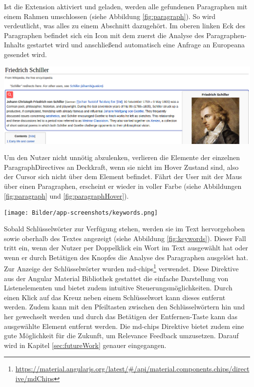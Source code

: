 Ist die Extension aktiviert und geladen, werden alle gefundenen Paragraphen mit einem Rahmen umschlossen (siehe Abbildung \ref{fig:paragraph}). So wird verdeutlicht, was alles zu einem Abschnitt dazugehört. Im oberen linken Eck des Paragraphen befindet sich ein Icon mit dem zuerst die Analyse des Paragraphen-Inhalts gestartet wird und anschließend automatisch eine Anfrage an Europeana gesendet wird.

 \begin{minipage}{\linewidth}
	\centering
	\vspace*{0.5cm}
	\includegraphics[width=\linewidth]{Bilder/app-screenshots/paragraph-hovered.png}
	\label{fig:paragraphHover}
	\vspace*{0.5cm}
 \end{minipage}

 Um den Nutzer nicht unnötig abzulenken, verlieren die Elemente der einzelnen ParagraphDirectives an Deckkraft, wenn sie nicht im Hover Zustand sind, also der Cursor sich nicht über dem Element befindet. Fährt der User mit der Maus über einen Paragraphen, erscheint er wieder in voller Farbe (siehe Abbildungen \ref{fig:paragraph} und \ref{fig:paragraphHover}).

 \begin{minipage}{\linewidth}
	\centering
	\vspace*{0.5cm}
	\texttt{[image: Bilder/app-screenshots/keywords.png]}
	\label{fig:keywords}
	\vspace*{0.5cm}
 \end{minipage}

 Sobald Schlüsselwörter zur Verfügung stehen, werden sie im Text hervorgehoben sowie oberhalb des Textes angezeigt (siehe Abbildung \ref{fig:keywords}). Dieser Fall tritt ein, wenn der Nutzer per Doppelklick ein Wort im Text ausgewählt hat oder wenn er durch Betätigen des Knopfes die Analyse des Paragraphen ausgelöst hat. Zur Anzeige der Schlüsselwörter wurden md-chips\footnote{\url{https://material.angularjs.org/latest/\#/api/material.components.chips/directive/mdChips}} verwendet. Diese Direktive aus der Angular Material Bibliothek gestattet die einfache Darstellung von Listenelementen und bietet zudem intuitive Steuerungsmöglichkeiten. Durch einen Klick auf das Kreuz neben einem Schlüsselwort kann dieses entfernt werden. Zudem kann mit den Pfeiltasten zwischen den Schlüsselwörtern hin und her gewechselt werden und durch das Betätigen der Entfernen-Taste kann das ausgewählte Element entfernt werden. Die md-chips Direktive bietet zudem eine gute Möglichkeit für die Zukunft, um Relevance Feedback umzusetzen. Darauf wird in Kapitel \ref{sec:futureWork} genauer eingegangen.


